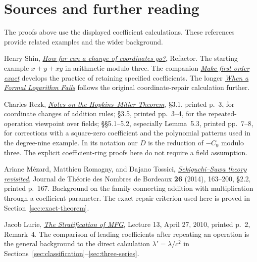 \clearpage
\section*{Sources and further reading}

The proofs above use the displayed coefficient calculations. These references provide related examples and the wider background.

\begin{enumerate}[leftmargin=*,label={[\arabic*]},itemsep=.65em]
\item Henry Shin, \href{https://refactor.press/refactors/coordinate-repair}{\emph{How far can a change of coordinates go?}}, Refactor. The starting example \(x+y+xy\) in arithmetic modulo three. The companion \href{https://refactor.press/refactors/first-order}{\emph{Make first order exact}} develops the practice of retaining specified coefficients. The longer \href{https://refactor.press/notes/when-a-formal-logarithm-fails}{\emph{When a Formal Logarithm Fails}} follows the original coordinate-repair calculation further.

\item Charles Rezk, \href{https://www.sas.rochester.edu/mth/sites/doug-ravenel/otherpapers/hopkins-miller-thm.pdf}{\emph{Notes on the Hopkins--Miller Theorem}}, \S3.1, printed p.~3, for coordinate changes of addition rules; \S3.5, printed pp.~3--4, for the repeated-operation viewpoint over fields; \S\S5.1--5.2, especially Lemma~5.3, printed pp.~7--8, for corrections with a square-zero coefficient and the polynomial patterns used in the degree-nine example. In its notation our \(D\) is the reduction of \(-C_9\) modulo three. The explicit coefficient-ring proofs here do not require a field assumption.

\item Ariane M\'ezard, Matthieu Romagny, and Dajano Tossici, \href{https://www.numdam.org/item/10.5802/jtnb.863.pdf}{\emph{Sekiguchi--Suwa theory revisited}}, Journal de Th\'eorie des Nombres de Bordeaux \textbf{26} (2014), 163--200, \S2.2, printed p.~167. Background on the family connecting addition with multiplication through a coefficient parameter. The exact repair criterion used here is proved in Section~\ref{sec:exact-theorem}.

\item Jacob Lurie, \href{https://www.math.ias.edu/~lurie/252xnotes/Lecture13.pdf}{\emph{The Stratification of MFG}}, Lecture 13, April 27, 2010, printed p.~2, Remark~4. The comparison of leading coefficients after repeating an operation is the general background to the direct calculation \(\lambda'=\lambda/c^2\) in Sections~\ref{sec:classification}--\ref{sec:three-series}.
\end{enumerate}
